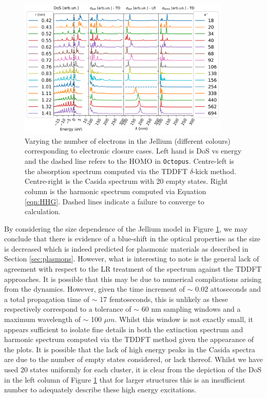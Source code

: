 \begin{figure}[ht!]
    \includegraphics[width=0.9\textwidth]{figures/LM/JLM/Sizes_Jlm.png}
    \caption{Varying the number of electrons in the Jellium (different colours) corresponding to electronic closure cases. Left hand is DoS vs energy and the dashed line refers to the HOMO in \texttt{Octopus}. Centre-left is the absorption spectrum computed via the TDDFT $\delta$-kick method. Centre-right is the Casida spectrum with 20 empty states. Right column is the harmonic spectrum computed via Equation \ref{eqn:HHG}. Dashed lines indicate a failure to converge to calculation.}
    \label{Fig:Jlm_Sizes}
\end{figure}

By considering the size dependence of the Jellium model in Figure \ref{Fig:Jlm_Sizes}, we may conclude that there is evidence of a blue-shift in the optical properties as the size is decreased which is indeed predicted for plasmonic materials as described in Section \ref{sec:plasmons}. However, what is interesting to note is the general lack of agreement with respect to the LR treatment of the spectrum against the TDDFT approaches. It is possible that this may be due to numerical complications arising from the dynamics. However, given the time increment of $\sim$ 0.02 attoseconds and a total propagation time of $\sim$ 17 femtoseconds, this is unlikely as these respectively correspond to a tolerance of $\sim$ 60 nm sampling windows and a maximum wavelength of $\sim$ 100 $\mu m$. Whilst this window is not exactly small, it appears sufficient to isolate fine details in both the extinction spectrum and harmonic spectrum computed via the TDDFT method given the appearance of the plots. It is possible that the lack of high energy peaks in the Casida spectra are due to the number of empty states considered, or lack thereof. Whilst we have used 20 states uniformly for each cluster, it is clear from the depiction of the DoS in the left column of Figure \ref{Fig:Jlm_Sizes} that for larger structures this is an insufficient number to adequately describe these high energy excitations.

